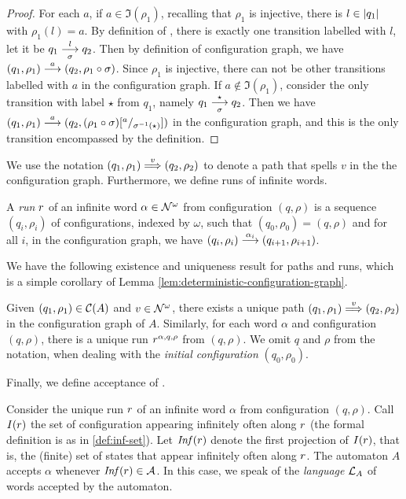 \begin{proof}
 For each $a$, if $a \in \Im(\rho_1)$, recalling that $\rho_1$ is injective, there is $l \in |q_1|$ with $\rho_1(l) = a$. By definition of \hdma, there is exactly one transition labelled with $l$, let it be $q_1 \overset{l}{\underset{\sigma}{\longrightarrow}} q_2$. Then by definition of configuration graph, we have $(q_1,\rho_1) \overset{a}{\longrightarrow} (q_2,\rho_1 \circ \sigma)$. Since $\rho_1$ is injective, there can not be other transitions labelled with $a$ in the configuration graph. If $a \notin \Im(\rho_1)$, consider the only transition with label $\star$ from $q_1$, namely $q_1 \overset{\star}{\underset{\sigma}{\longrightarrow}} q_2$.  Then we have $(q_1,\rho_1) \overset{a}{\longrightarrow} (q_2,(\rho_1 \circ \sigma)[{}^{a}/_{\sigma^{-1}(\star)}])$ in the configuration graph, and this is the only transition encompassed by the definition.
\end{proof}

\noindent We use the notation $(q_1,\rho_1) \overset{v}{\Longrightarrow} (q_2,\rho_2)$ to denote a path that spells $v$ in the the configuration graph. Furthermore, we define runs of infinite words.
%

\begin{definition}
 A \emph{run} $r$ of an infinite word $\alpha \in \mathcal{N}^\omega$ from configuration $(q,\rho)$ is a sequence $(q_i,\rho_i)$ of configurations, indexed by $\omega$, such that $(q_0,\rho_0)=(q,\rho)$ and for all $i$, in the configuration graph, we have $(q_i,\rho_i) \overset{\alpha_i}{\longrightarrow} (q_{i+1},\rho_{i+1})$. 
\end{definition}

\noindent We have the following existence and uniqueness result for paths and runs, which is a simple corollary of Lemma \ref{lem:deterministic-configuration-graph}.

\begin{proposition}
\label{prop:unique-path}
Given $(q_1,\rho_1) \in \mathcal{C}(A)$ and $v \in \mathcal{N}^\omega$, there exists a unique path $(q_1,\rho_1) \overset{v}{\Longrightarrow} (q_2,\rho_2)$ in the configuration graph of $A$. Similarly, for each word $\alpha$ and configuration $(q,\rho)$, there is a unique run $r^{\alpha,q,\rho}$ from $(q,\rho)$. We omit $q$ and $\rho$ from the notation, when dealing with the \emph{initial configuration} $(q_0,\rho_0)$.
\end{proposition}

\noindent Finally, we define acceptance of \hdmas. 

\begin{definition}\label{def:acceptance-of-hdmas}
 Consider the unique run $r$ of an infinite word $\alpha$ from configuration $(q,\rho)$. Call $I(r)$ the set of configuration appearing infinitely often along $r$ (the formal definition is as in \ref{def:inf-set}). Let $\mathit{Inf}(r)$ denote the first projection of $I(r)$, that is, the (finite) set of states that appear infinitely often along $r$. The automaton $A$ accepts $\alpha$ whenever $\mathit{Inf}(r) \in \mathcal{A}$. In this case, we speak of the \emph{language} $\mathcal{L}_A$ of words accepted by the automaton.
\end{definition}

